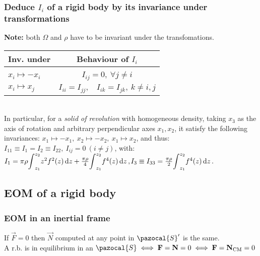 \subsubsection*{Deduce $I_{i}$ of a rigid body by its invariance under transformations}
\textbf{Note:} both $\Omega$ and $\rho$ have to be invariant under the transfomations.\\
\begin{tabular}{ l | c }
  \textbf{Inv. under} & \textbf{Behaviour of $I_{i}$}\\[0.1em]
  \hline\\[-2pt]
  $x_{i}\mapsto -x_{i}$ & $I_{ij}=0,\ \forall j\neq i$ \\[2pt]
  $x_{i}\mapsto x_{j}$ & $I_{ii}=I_{jj},\ \ \ \ I_{ik}=I_{jk},\ k\neq i,j$ \\
\end{tabular}\\
In particular, for a \emph{solid of revolution} with homogeneous density, taking ${x_{3}}$ as the axis of rotation and arbitrary perpendicular axes ${x_{1}},{x_{2}}$, it satisfy the following invariances: $x_{1}\mapsto -x_{1},\ x_{2}\mapsto -x_{2},\ x_{1}\mapsto x_{2}$, and thus: \\
$I_{11}\equiv I_{1}=I_{2}\equiv I_{22},\ I_{ij}=0\ (i\neq j)$, with: \\
$I_{1}=\pi\rho\scaleint{5ex}_{z_{1}}^{z_{2}} z^{2}f^{2}(z)\dd{z}+\frac{\pi\rho}{4}\scaleint{5ex}
_{z_{1}}^{z_{2}}f^{4}(z)\dd{z},$\hfill$ I_{3}\equiv I_{33}=\frac{\pi\rho}{2}\scaleint{5ex}_{z_{1}}^{z_{2}}f^{4}(z)\dd{z}.$



\subsection{EOM of a rigid body}
\subsubsection*{EOM in an inertial frame}
If $\vec{F}=0$ then $\vec{N}$ computed at any point in $\pazocal{S}'$ is the same.\\
A r.b. is in equilibrium in an $\pazocal{S}\iff \vec{F}=\vec{N}=0\iff \vec{F}=\vec{N}_{\text{CM}}=0$



